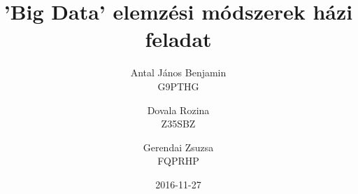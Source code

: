 \documentclass{article}
\date{2016-11-27}
\title{'Big Data' elemzési módszerek házi feladat}
\author{Antal János Benjamin\\G9PTHG \and Dovala Rozina\\Z35SBZ \and Gerendai Zsuzsa\\FQPRHP}
\numberwithin{figure}{section}
\begin{document}
	\begin{sloppypar}
		\maketitle
		\newpage
		
		\newpage
		
		
	\end{sloppypar}
\end{document}
